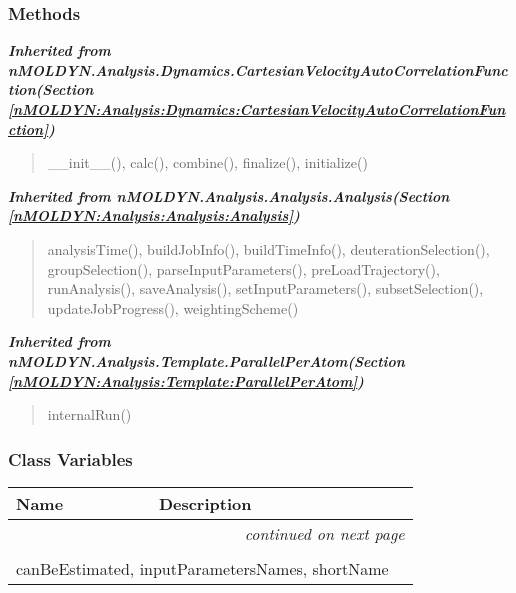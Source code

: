
  \subsubsection{Methods}


\large{\textbf{\textit{Inherited from nMOLDYN.Analysis.Dynamics.CartesianVelocityAutoCorrelationFunction\textit{(Section \ref{nMOLDYN:Analysis:Dynamics:CartesianVelocityAutoCorrelationFunction})}}}}

\begin{quote}
\_\_init\_\_(), calc(), combine(), finalize(), initialize()
\end{quote}

\large{\textbf{\textit{Inherited from nMOLDYN.Analysis.Analysis.Analysis\textit{(Section \ref{nMOLDYN:Analysis:Analysis:Analysis})}}}}

\begin{quote}
analysisTime(), buildJobInfo(), buildTimeInfo(), deuterationSelection(), groupSelection(), parseInputParameters(), preLoadTrajectory(), runAnalysis(), saveAnalysis(), setInputParameters(), subsetSelection(), updateJobProgress(), weightingScheme()
\end{quote}

\large{\textbf{\textit{Inherited from nMOLDYN.Analysis.Template.ParallelPerAtom\textit{(Section \ref{nMOLDYN:Analysis:Template:ParallelPerAtom})}}}}

\begin{quote}
internalRun()
\end{quote}


  \subsubsection{Class Variables}

    \vspace{-1cm}
\hspace{\varindent}\begin{longtable}{|p{\varnamewidth}|p{\vardescrwidth}|l}
\cline{1-2}
\cline{1-2} \centering \textbf{Name} & \centering \textbf{Description}& \\
\cline{1-2}
\endhead\cline{1-2}\multicolumn{3}{r}{\small\textit{continued on next page}}\\\endfoot\cline{1-2}
\endlastfoot\multicolumn{2}{|l|}{\textit{Inherited from nMOLDYN.Analysis.Dynamics.CartesianVelocityAutoCorrelationFunction \textit{(Section \ref{nMOLDYN:Analysis:Dynamics:CartesianVelocityAutoCorrelationFunction})}}}\\
\multicolumn{2}{|p{\varwidth}|}{\raggedright canBeEstimated, inputParametersNames, shortName}\\
\cline{1-2}
\end{longtable}

